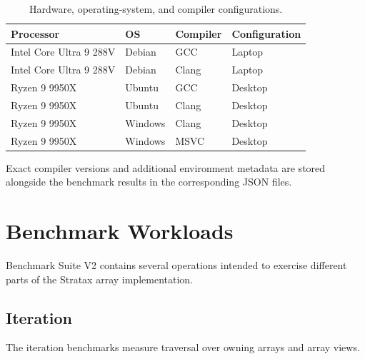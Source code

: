\documentclass[11pt]{article}
\newcommand{\project}{Stratax}
\newcommand{\benchmarkversion}{V2}
\begin{document}
\begin{table}[H]
    \centering
    \begin{tabular}{llll}
        \toprule
        \textbf{Processor} &
        \textbf{OS} &
        \textbf{Compiler} &
        \textbf{Configuration} \\
        \midrule

        Intel Core Ultra 9 288V &
        Debian &
        GCC &
        Laptop \\

        Intel Core Ultra 9 288V &
        Debian &
        Clang &
        Laptop \\

        Ryzen 9 9950X &
        Ubuntu &
        GCC &
        Desktop \\

        Ryzen 9 9950X &
        Ubuntu &
        Clang &
        Desktop \\

        Ryzen 9 9950X &
        Windows &
        Clang &
        Desktop \\

        Ryzen 9 9950X &
        Windows &
        MSVC &
        Desktop \\

        \bottomrule
    \end{tabular}

    \caption{
        Hardware, operating-system, and compiler configurations.
    }

    \label{tab:platforms}
\end{table}

Exact compiler versions and additional environment metadata are
stored alongside the benchmark results in the corresponding JSON
files.


\section{Benchmark Workloads}

Benchmark Suite \benchmarkversion{} contains several operations
intended to exercise different parts of the \project{} array
implementation.


\subsection{Iteration}

The iteration benchmarks measure traversal over owning arrays
and array views.
\end{document}
